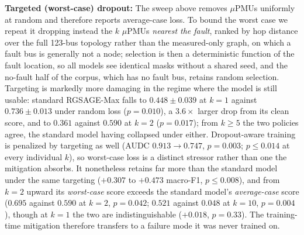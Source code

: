 \documentclass[3p,times,procedia]{elsarticle}
\begin{document}
\textbf{Targeted (worst-case) dropout:} The sweep above removes $\mu$PMUs uniformly at random and therefore reports average-case loss. To bound the worst case we repeat it dropping instead the $k$ $\mu$PMUs \emph{nearest the fault}, ranked by hop distance over the full 123-bus topology rather than the measured-only graph, on which a fault bus is generally not a node; selection is then a deterministic function of the fault location, so all models see identical masks without a shared seed, and the no-fault half of the corpus, which has no fault bus, retains random selection. Targeting is markedly more damaging in the regime where the model is still usable: standard RGSAGE-Max falls to $0.448\pm0.039$ at $k=1$ against $0.736\pm0.013$ under random loss ($p=0.010$), a $3.6\times$ larger drop from its clean score, and to $0.361$ against $0.590$ at $k=2$ ($p=0.017$); from $k\ge5$ the two policies agree, the standard model having collapsed under either. Dropout-aware training is penalized by targeting as well (AUDC $0.913\!\to\!0.747$, $p=0.003$; $p\le0.014$ at every individual $k$), so worst-case loss is a distinct stressor rather than one the mitigation absorbs. It nonetheless retains far more than the standard model under the same targeting ($+0.307$ to $+0.473$ macro-F1, $p\le0.008$), and from $k=2$ upward its \emph{worst-case} score exceeds the standard model's \emph{average-case} score ($0.695$ against $0.590$ at $k=2$, $p=0.042$; $0.521$ against $0.048$ at $k=10$, $p=0.004$), though at $k=1$ the two are indistinguishable ($+0.018$, $p=0.33$). The training-time mitigation therefore transfers to a failure mode it was never trained on.
\end{document}
